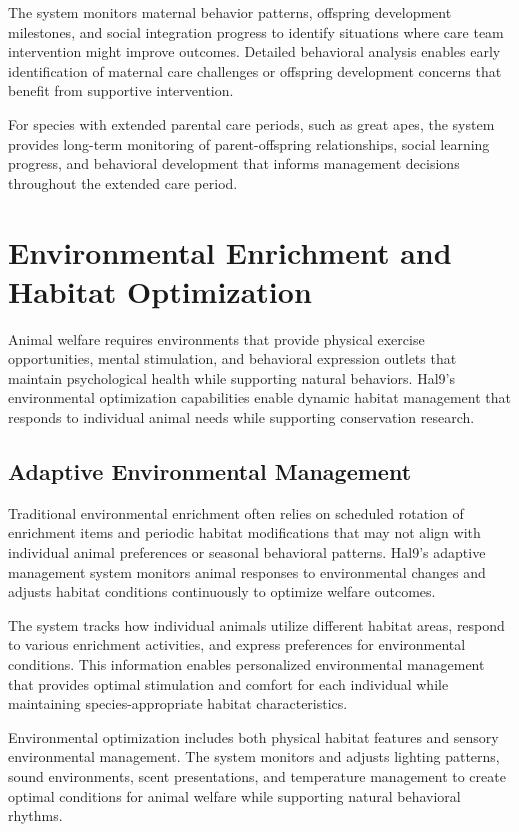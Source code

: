 \documentclass[
  Letterpaper,
]{scrbook}
\begin{document}
The system monitors maternal behavior patterns, offspring development
milestones, and social integration progress to identify situations where
care team intervention might improve outcomes. Detailed behavioral
analysis enables early identification of maternal care challenges or
offspring development concerns that benefit from supportive
intervention.

For species with extended parental care periods, such as great apes, the
system provides long-term monitoring of parent-offspring relationships,
social learning progress, and behavioral development that informs
management decisions throughout the extended care period.

\section{Environmental Enrichment and Habitat
Optimization}\label{environmental-enrichment-and-habitat-optimization}

Animal welfare requires environments that provide physical exercise
opportunities, mental stimulation, and behavioral expression outlets
that maintain psychological health while supporting natural behaviors.
Hal9's environmental optimization capabilities enable dynamic habitat
management that responds to individual animal needs while supporting
conservation research.

\subsection{Adaptive Environmental
Management}\label{adaptive-environmental-management}

Traditional environmental enrichment often relies on scheduled rotation
of enrichment items and periodic habitat modifications that may not
align with individual animal preferences or seasonal behavioral
patterns. Hal9's adaptive management system monitors animal responses to
environmental changes and adjusts habitat conditions continuously to
optimize welfare outcomes.

The system tracks how individual animals utilize different habitat
areas, respond to various enrichment activities, and express preferences
for environmental conditions. This information enables personalized
environmental management that provides optimal stimulation and comfort
for each individual while maintaining species-appropriate habitat
characteristics.

Environmental optimization includes both physical habitat features and
sensory environmental management. The system monitors and adjusts
lighting patterns, sound environments, scent presentations, and
temperature management to create optimal conditions for animal welfare
while supporting natural behavioral rhythms.
\end{document}

